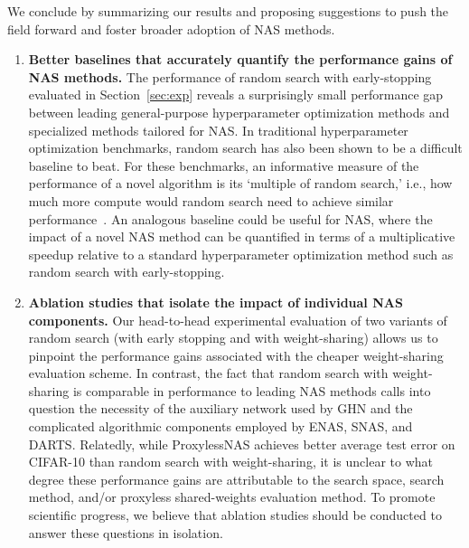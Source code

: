 \documentclass[acmlarge, nonacm]{acmart}
\begin{document}
We conclude by summarizing our results and proposing suggestions to push the field forward and foster broader adoption of NAS methods.
\begin{enumerate}
    \item \textbf{Better baselines that accurately quantify the performance gains of NAS methods.} The performance of random search with early-stopping evaluated in Section~\ref{sec:exp} reveals a surprisingly small performance gap between leading general-purpose hyperparameter optimization methods and specialized methods tailored for NAS.  In traditional hyperparameter optimization benchmarks, random search has also been shown to be a difficult baseline to beat. For these benchmarks, an informative measure of the performance of a novel algorithm is its `multiple of random search,' i.e., how much more compute would random search need to achieve similar performance~\cite{hyperband}.  
    An analogous baseline could be useful for NAS, where the impact of a novel NAS method can be quantified in terms of a multiplicative speedup relative to a standard hyperparameter optimization method such as random search with early-stopping.
    \item \textbf{Ablation studies that isolate the impact of individual NAS components.} 
    Our head-to-head experimental evaluation of two variants of random search (with early stopping and with weight-sharing) 
    allows us to pinpoint
    the performance gains associated with the cheaper weight-sharing 
    evaluation scheme. In contrast, the fact that random search with weight-sharing is comparable in performance to leading NAS methods calls into question the necessity of the auxiliary network used by GHN and the complicated algorithmic components employed by ENAS, SNAS, and DARTS.  Relatedly, while ProxylessNAS achieves better average test error on CIFAR-10 than random search with weight-sharing, it is unclear to what degree these performance gains are attributable to the search space, search method, and/or proxyless shared-weights evaluation method.  To promote scientific progress, we believe that ablation studies should be conducted to answer these questions in isolation.
  

\end{enumerate}
\end{document}
